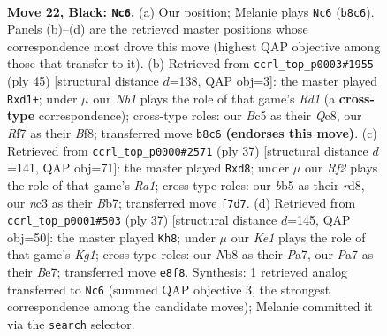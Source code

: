 \documentclass[11pt]{article}
\begin{document}
\clearpage

\begin{figure}[p]\centering
\begin{subfigure}{0.46\textwidth}\centering
\resizebox{\linewidth}{!}{%
\newchessgame
\chessboard[
  setfen={rn1qk3/pp3r1R/4bQp1/1Bb3P1/P7/2N2N2/1P3P2/R1B1K3 b Q - 6 22},
  showmover=false,
  pgfstyle=straightmove, color=movearrow, markmove={b8-c6}
]}
\caption{}
\end{subfigure}\hfill
\begin{subfigure}{0.46\textwidth}\centering
\resizebox{\linewidth}{!}{%
\newchessgame
\chessboard[
  setfen={r1qr1bk1/2p2pp1/5n1p/R1B5/1nN5/2N2QP1/1P3P1P/3R2K1 b - - 5 23},
  showmover=false,
  pgfstyle=straightmove, color=movearrow, markmove={d8-d1}
]}
\caption{}
\end{subfigure}
\\[4pt]
\begin{subfigure}{0.46\textwidth}\centering
\resizebox{\linewidth}{!}{%
\newchessgame
\chessboard[
  setfen={r2R2k1/1b3pp1/p3p2p/q7/1b6/2N2P2/PPP1Q1PP/1K2B2R b - - 0 19},
  showmover=false,
  pgfstyle=straightmove, color=movearrow, markmove={a8-d8}
]}
\caption{}
\end{subfigure}\hfill
\begin{subfigure}{0.46\textwidth}\centering
\resizebox{\linewidth}{!}{%
\newchessgame
\chessboard[
  setfen={r1b3k1/p3br1n/2pp2Qp/2q1P3/2B5/2N4P/P1P3P1/1R5K b - - 3 19},
  showmover=false,
  pgfstyle=straightmove, color=movearrow, markmove={g8-h8}
]}
\caption{}
\end{subfigure}
\caption{\textbf{Move 22, Black: \texttt{Nc6}.} (a) Our position; Melanie plays \texttt{Nc6} (\texttt{b8c6}). Panels (b)--(d) are the retrieved master positions whose correspondence most drove this move (highest QAP objective among those that transfer to it). (b) Retrieved from \texttt{ccrl\_top\_p0003\#1955} (ply 45) [structural distance $d$=138, QAP obj=3]: the master played \texttt{Rxd1+}; under $\mu$ our \emph{Nb1} plays the role of that game's \emph{Rd1} (a \textbf{cross-type} correspondence); cross-type roles: our \emph{B}c5 as their \emph{Q}c8, our \emph{R}f7 as their \emph{B}f8; transferred move \texttt{b8c6} \textbf{(endorses this move)}. (c) Retrieved from \texttt{ccrl\_top\_p0000\#2571} (ply 37) [structural distance $d$=141, QAP obj=71]: the master played \texttt{Rxd8}; under $\mu$ our \emph{Rf2} plays the role of that game's \emph{Ra1}; cross-type roles: our \emph{b}b5 as their \emph{r}d8, our \emph{n}c3 as their \emph{B}b7; transferred move \texttt{f7d7}. (d) Retrieved from \texttt{ccrl\_top\_p0001\#503} (ply 37) [structural distance $d$=145, QAP obj=50]: the master played \texttt{Kh8}; under $\mu$ our \emph{Ke1} plays the role of that game's \emph{Kg1}; cross-type roles: our \emph{N}b8 as their \emph{P}a7, our \emph{P}a7 as their \emph{B}e7; transferred move \texttt{e8f8}. Synthesis: 1 retrieved analog transferred to \texttt{Nc6} (summed QAP objective 3, the strongest correspondence among the candidate moves); Melanie committed it via the \texttt{search} selector.}
\label{fig:thought-m43}
\end{figure}
\end{document}
